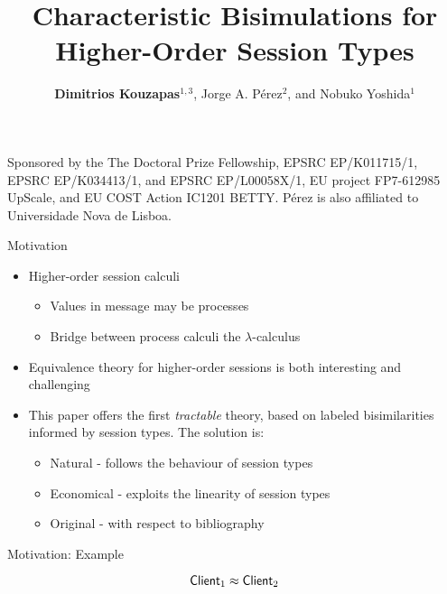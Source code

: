 \documentclass{beamer}
\title{Characteristic Bisimulations for Higher-Order Session Types}
\author{{\bf Dimitrios Kouzapas$^{1,3}$}, Jorge A. P\'{e}rez$^{2}$, and Nobuko Yoshida$^1$}
\institute{Imperial College London$^1$, University of Groningen$^2$, University of Glasgow$^3$}
\date
\begin{document}
	\begin{frame}
		\titlepage

		{ \tiny %
		Sponsored by the The Doctoral Prize Fellowship, EPSRC EP/K011715/1,
		EPSRC EP/K034413/1, and EPSRC EP/L00058X/1,
		EU project FP7-612985 UpScale, and EU COST Action IC1201 BETTY.  
		P\'{e}rez is  also affiliated to
		Universidade Nova de Lisboa.%
		}
	\end{frame}

	\begin{frame}{Motivation}
		\begin{itemize}
			\item	Higher-order session calculi

				\begin{itemize}
					\item	Values in message may be processes
					\item	Bridge between process calculi the $\lambda$-calculus
				\end{itemize}


			\item	Equivalence theory for higher-order sessions is both interesting and challenging

			\item	This paper offers the first {\em tractable} theory, based on labeled bisimilarities
				informed by session types. The solution is:
				\begin{itemize}
					\item	Natural - follows the behaviour of session types
					\item	Economical - exploits the linearity of session types
					\item	Original - with respect to bibliography
				\end{itemize}
		\end{itemize}
	\end{frame}

	\begin{frame}{Motivation: Example}
		

		\[
			\textsf{Client}_1 \approx \textsf{Client}_2
		\]
	\end{frame}
\end{document}
